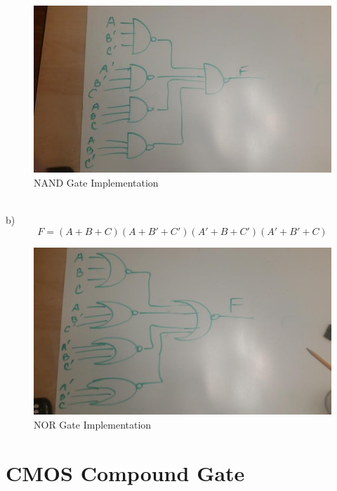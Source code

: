 \documentclass[11pt]{article}
\begin{document}
\begin{figure}[H]
\centering
\includegraphics[width=1\linewidth]{nand}
\caption{NAND Gate Implementation}
\label{fig:nand}
\end{figure}
~\\	
b) $$F = (A+B+C)(A+B'+C')(A'+B+C')(A'+B'+C)$$
\begin{figure}[H]
\centering
\includegraphics[width=1\linewidth]{nor}
\caption{NOR Gate Implementation}
\label{fig:nor}
\end{figure}

\section{CMOS Compound Gate}
\end{document}
